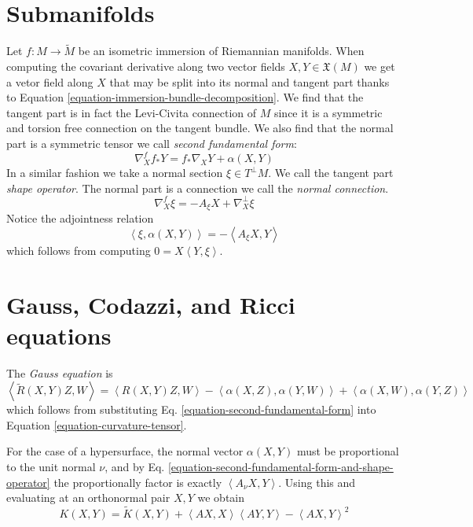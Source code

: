 \section{Submanifolds}
\label{section-submanifolds}

Let $f:M \to \tilde{M}$ be an isometric immersion of Riemannian manifolds. When
computing the covariant derivative along two vector fields 
$X,Y \in\mathfrak{X}(M)$ we get a vetor field along $X$ that may be split into
its normal and tangent part thanks to Equation 
\ref{equation-immersion-bundle-decomposition}. We find that the tangent part is
in fact the Levi-Civita connection of $M$ since it is a symmetric and torsion
free connection on the tangent bundle. We also find that the normal part is a
symmetric tensor we call {\it second fundamental form}:
\begin{equation}
\label{equation-second-fundamental-form}
\nabla^{f}_X f_*Y=f_*\nabla_XY+\alpha(X,Y)
\end{equation}
In a similar fashion we take a normal section $\xi\in T^\perp M$. 
We call the tangent part {\it shape operator}. The normal part is a connection 
we call the {\it normal connection}.
\begin{equation}
\label{equation-shape-operator}
\nabla^f_X\xi=-A_\xi X+\nabla^\perp_X\xi
\end{equation}
Notice the adjointness relation
\begin{equation}
\label{equation-second-fundamental-form-and-shape-operator}
\left<\xi,\alpha(X,Y)\right>=-\left<A_\xi X,Y\right>
\end{equation}
which follows from computing $0=X\left<Y,\xi\right>$.

\section{Gauss, Codazzi, and Ricci equations}
\label{section-Gauss-Codazzi-Ricci}

The {\it Gauss equation} is
\begin{equation}
\label{equation-Gauss}
\left<\tilde{R}(X,Y)Z,W\right>=\left<R(X,Y)Z,W\right>
-\left<\alpha(X,Z),\alpha(Y,W)\right>+\left<\alpha(X,W),\alpha(Y,Z)\right>
\end{equation}
which follows from substituting Eq. \ref{equation-second-fundamental-form} 
into Equation \ref{equation-curvature-tensor}.

For the case of a hypersurface, the normal vector $\alpha(X,Y)$ must be
proportional to the unit normal $\nu$, and by Eq.
\ref{equation-second-fundamental-form-and-shape-operator} the proportionally
factor is exactly $\left<A_\nu X,Y\right>$. Using this and evaluating
 at an orthonormal pair $X,Y$ we obtain
\begin{equation}
\label{equation-Gauss-hypersurface}
K(X,Y)=\tilde{K}(X,Y)+\left<AX,X\right>\left<AY,Y\right>-\left<AX,Y\right>^2
\end{equation}

